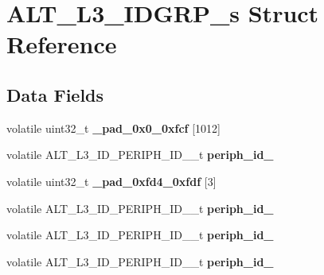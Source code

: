 \hypertarget{structALT__L3__IDGRP__s}{}\section{A\+L\+T\+\_\+\+L3\+\_\+\+I\+D\+G\+R\+P\+\_\+s Struct Reference}
\label{structALT__L3__IDGRP__s}
\subsection*{Data Fields}
\begin{DoxyCompactItemize}
\item 
\mbox{\label{structALT__L3__IDGRP__s_a308d88592a91e22ccf3dfecee88a8602}} 
volatile uint32\+\_\+t {\bfseries \+\_\+pad\+\_\+0x0\+\_\+0xfcf} \mbox{[}1012\mbox{]}
\item 
\mbox{\label{structALT__L3__IDGRP__s_a9f0bd683b5f83d32cd6fe682972bfbb7}} 
volatile A\+L\+T\+\_\+\+L3\+\_\+\+I\+D\+\_\+\+P\+E\+R\+I\+P\+H\+\_\+\+I\+D\+\_\+\_\+t {\bfseries periph\+\_\+id\+\_}
\item 
\mbox{\label{structALT__L3__IDGRP__s_a4605e239159eabedc5745015ebab1e6b}} 
volatile uint32\+\_\+t {\bfseries \+\_\+pad\+\_\+0xfd4\+\_\+0xfdf} \mbox{[}3\mbox{]}
\item 
\mbox{\label{structALT__L3__IDGRP__s_a1c7fd5faf0e55ea814bb953ef1e0f6ba}} 
volatile A\+L\+T\+\_\+\+L3\+\_\+\+I\+D\+\_\+\+P\+E\+R\+I\+P\+H\+\_\+\+I\+D\+\_\+\_\+t {\bfseries periph\+\_\+id\+\_}
\item 
\mbox{\label{structALT__L3__IDGRP__s_a2ce7003273dd5ad16b5da834c3e474f5}} 
volatile A\+L\+T\+\_\+\+L3\+\_\+\+I\+D\+\_\+\+P\+E\+R\+I\+P\+H\+\_\+\+I\+D\+\_\+\_\+t {\bfseries periph\+\_\+id\+\_}
\item 
\mbox{\label{structALT__L3__IDGRP__s_ae736a694e2bb1ab15d6cb1e5c559af43}} 
volatile A\+L\+T\+\_\+\+L3\+\_\+\+I\+D\+\_\+\+P\+E\+R\+I\+P\+H\+\_\+\+I\+D\+\_\+\_\+t {\bfseries periph\+\_\+id\+\_}
\item 
\mbox{\label{structALT__L3__IDGRP__s_a767ad3ec12a4ed9a2be92c19db1650f9}} 

\end{DoxyCompactItemize}
